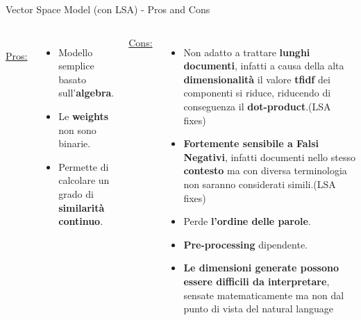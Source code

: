 \documentclass[british]{beamer}
\begin{document}
\begin{frame}{Vector Space Model (con LSA) - Pros and Cons}	
	\begin{columns}
		\\
		\underline{Pros:}
		\begin{itemize}
			\item Modello semplice basato sull'\textbf{algebra}.
			\item Le \textbf{weights} non sono binarie.
			\item Permette di calcolare un grado di \textbf{similarit\`{a} continuo}.
		\end{itemize}
		\underline{Cons:}
		\begin{itemize}
			\item Non adatto a trattare \textbf{lunghi documenti}, infatti a causa della alta \textbf{dimensionalit\`{a}} il valore \textbf{tfidf} dei componenti si riduce, riducendo di conseguenza il \textbf{dot-product}.(\alert{LSA fixes})
			\item \textbf{Fortemente sensibile a Falsi Negativi}, infatti documenti nello stesso \textbf{contesto} ma con diversa terminologia non saranno considerati simili.(\alert{LSA fixes})
			\item \alert{Perde \textbf{l'ordine delle parole}}.
			\item \textbf{Pre-processing} dipendente.
			\item \textbf{\alert{Le dimensioni generate possono essere difficili da interpretare}}, sensate matematicamente ma non dal punto di vista del natural language
		\end{itemize}
	\end{columns}
\end{frame}

\end{document}
